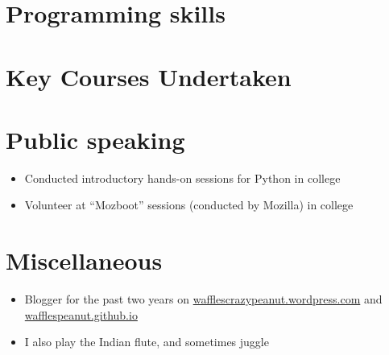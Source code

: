 \documentclass[11pt,a4paper,sans]{moderncv}        %
\newcommand\chref[3][linky]{\href{#2}{\color{#1}#3}}
\begin{document}


\section{Programming skills}

\section{Key Courses Undertaken}

\section{Public speaking}
\begin{itemize}
\item Conducted introductory hands-on sessions for Python in college
\item Volunteer at ``Mozboot'' sessions (conducted by Mozilla) in college
\end{itemize}

\section{Miscellaneous}
\begin{itemize}
\item Blogger for the past two years on \chref{https://wafflescrazypeanut.wordpress.com/}{wafflescrazypeanut.wordpress.com} and \chref{https://wafflespeanut.github.io/}{wafflespeanut.github.io}
\item I also play the Indian flute, and sometimes juggle
\end{itemize}
\end{document}
